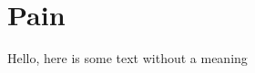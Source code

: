 \documentclass[../main.tex]{subfiles}
\begin{document}
    \section{Pain}

    Hello, here is some text without a meaning
\end{document}
